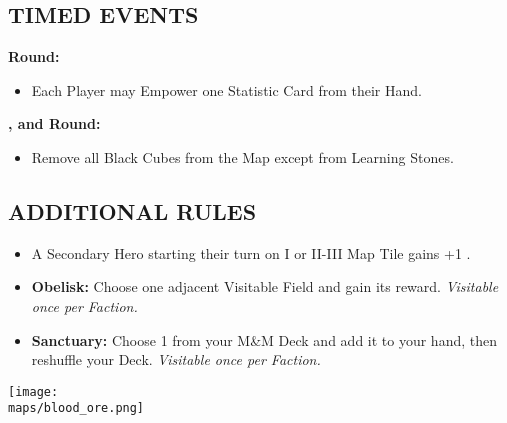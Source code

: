 \begin{multicols*}{2}
\subsection*{\MakeUppercase{Timed Events}}
\textbf{ Round:}
\begin{itemize}
  \item Each Player may Empower one Statistic Card from their Hand.
\end{itemize}
\textbf{,  and  Round:}
\begin{itemize}
  \item Remove all Black Cubes from the Map except from Learning Stones.
\end{itemize}
\subsection*{\MakeUppercase{Additional Rules}}
\begin{itemize}
  \item A Secondary Hero starting their turn on I or II-III Map Tile gains +1 .
  \item \textbf{Obelisk:} Choose one adjacent Visitable Field and gain its reward. \textit{Visitable once per Faction.}
  \item \textbf{Sanctuary:} Choose 1  from your M&M Deck and add it to your hand, then reshuffle your Deck. \textit{Visitable once per Faction.}
\end{itemize}

\begin{center}
  \vfill
  \texttt{[image: \\maps/blood\_ore.png]}
  \vfill
\end{center}

\end{multicols*}
